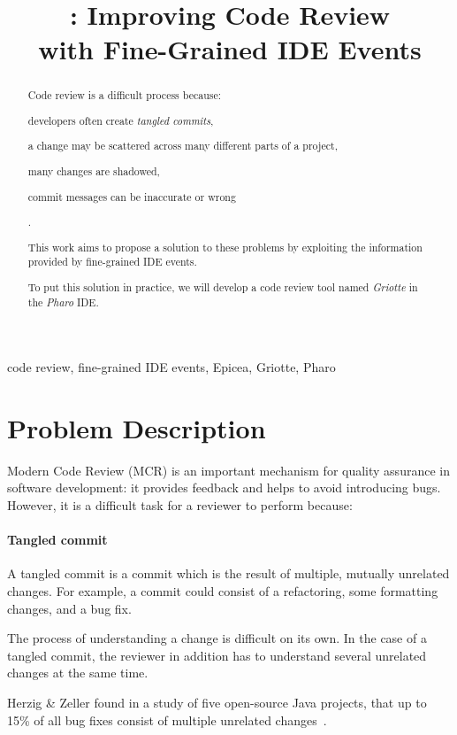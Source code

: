 \documentclass[conference,a4paper]{IEEEtran}
\title{\Gr{}: Improving Code Review\\with Fine-Grained IDE Events}
\author{\IEEEauthorblockN{Skip~Lentz}\IEEEauthorblockA{EEMCS\\Delft
    University of Technology} \and
  \IEEEauthorblockN{Mart\'{i}n~Dias}\IEEEauthorblockA{RMoD\\INRIA
    Lille-Nord Europe} \and
  \IEEEauthorblockN{Damien~Cassou}\IEEEauthorblockA{RMoD\\INRIA
    Lille-Nord Europe}}
\newcommand{\TC}{tangled commit}
\newcommand{\Ep}{Epicea}
\newcommand{\Gr}{Griotte}
\begin{document}
\maketitle{}
\begin{abstract}
  Code review is a difficult process because:
  \begin{enumerate*}[label=(\arabic*)]
  \item developers often create \textit{tangled commits},
  \item a change may be scattered across many different parts of a
    project,
  \item many changes are shadowed,
  \item commit messages can be inaccurate or wrong
  \end{enumerate*}.

  This work aims to propose a solution to these problems by exploiting
  the information provided by fine-grained IDE events.

  To put this solution in practice, we will develop a code review tool
  named \textit{\Gr} in the \textit{Pharo} IDE.
\end{abstract}
\begin{IEEEkeywords}
  code review, fine-grained IDE events, \Ep, \Gr, Pharo
\end{IEEEkeywords}

\section{Problem Description}
\label{sec:problem-description}
Modern Code Review (MCR) is an important mechanism for quality
assurance in software development: it provides feedback and helps to
avoid introducing bugs. However, it is a difficult task for a reviewer
to perform because:

\paragraph{Tangled commit}

A \TC{} is a commit which is the result of multiple, mutually
unrelated changes. For example, a commit could consist of a
refactoring, some formatting changes, and a bug fix.

The process of understanding a change is difficult on its own. In the
case of a tangled commit, the reviewer in addition has to understand
several unrelated changes at the same time.

Herzig \& Zeller found in a study of five open-source Java projects,
that up to 15\% of all bug fixes consist of multiple unrelated
changes~\cite{Herz11a}.
\end{document}
